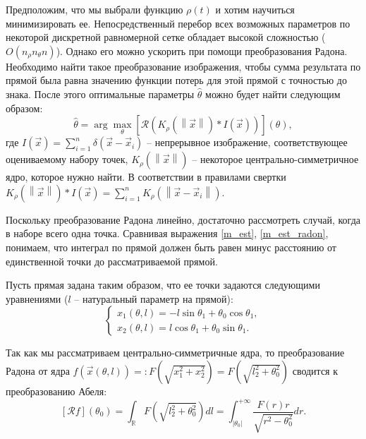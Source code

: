 Предположим, что мы выбрали функцию $\rho(t)$ и хотим научиться минимизировать ее.
Непосредственный перебор всех возможных параметров по некоторой дискретной равномерной сетке обладает высокой сложностью ($O\left( n_\rho n_\theta n \right)$).
Однако его можно ускорить при помощи преобразования Радона.
Необходимо найти такое преобразование изображения, чтобы сумма результата по прямой была равна значению функции потерь для этой прямой с точностью до знака.
После этого оптимальные параметры $\hat\theta$ можно будет найти следующим образом:
\begin{equation}
\label{m_est_radon}
    \hat\theta = \arg\max_{\theta} \left[ \mathcal{R} \left( K_{\rho}\left( \left\| \vec x \right\| \right) * I\left( \vec x \right) \right) \right]\left( \theta \right),
\end{equation}
где $I\left( \vec x \right) = \sum_{i=1}^n \delta\left( \vec x - \vec x_i \right)$ -- непрерывное изображение, соответствующее оцениваемому набору точек, $K_{\rho}\left( \left\| \vec x \right\| \right)$ -- некоторое центрально-симметричное ядро, которое нужно найти.
В соответствии в правилами свертки $K_{\rho}\left( \left\| \vec x \right\| \right) * I\left( \vec x \right) = \sum_{i=1}^n K_\rho\left( \left\| \vec x - \vec x_i \right\| \right)$.

Поскольку преобразование Радона линейно, достаточно рассмотреть случай, когда в наборе всего одна точка. Сравнивая выражения \eqref{m_est}, \eqref{m_est_radon}, понимаем, что интеграл по прямой должен быть равен минус расстоянию от единственной точки до рассматриваемой прямой.

Пусть прямая задана таким образом, что ее точки задаются следующими уравнениями ($l$ -- натуральный параметр на прямой):
\begin{equation*}
    \begin{cases}
        x_1(\theta, l) = -l \sin\theta_1 + \theta_0 \cos\theta_1,\\
        x_2(\theta, l) =  l \cos\theta_1 + \theta_0 \sin\theta_1.
    \end{cases}
\end{equation*}

Так как мы рассматриваем центрально-симметричные ядра, то преобразование Радона от ядра $f\left( \vec x\left( \theta, l \right) \right) =: F\left( \sqrt{x_1^2 + x_2^2} \right) = F\left( \sqrt{l_2^2 + \theta_0^2} \right)$ сводится к преобразованию Абеля:
\begin{equation*}
    \left[ \mathcal{R}f \right]\left( \theta_0 \right) =
    \int_{\mathbb{R}} F\left( \sqrt{l_2^2 + \theta_0^2} \right) dl =
    \int_{|\theta_0|}^{+\infty} \frac{F(r)r}{\sqrt{r^2 - \theta_0^2}} dr.
\end{equation*}

